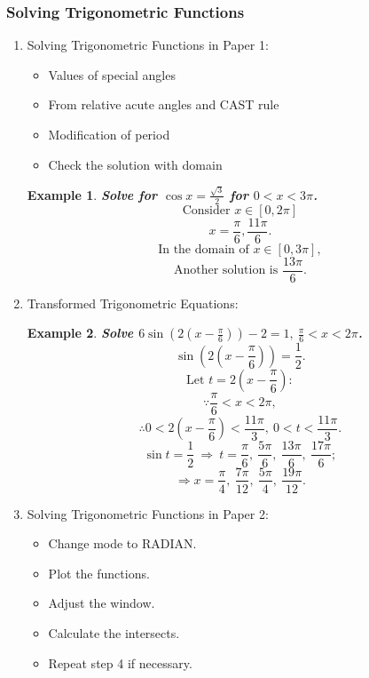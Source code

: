 \documentclass[12pt, a4paper]{article}
\newtheorem{example}{Example}[subsection]
\begin{document}
\subsubsection{Solving Trigonometric Functions}
\begin{enumerate}
  \item Solving Trigonometric Functions in Paper 1: 
  \begin{itemize}
    \item Values of special angles
    \item From relative acute angles and CAST rule
    \item Modification of period
    \item Check the solution with domain
  \end{itemize}
  \begin{example}
    \textbf{Solve for $\cos{x}=\frac{\sqrt{3}}{2}$ for $0<x<3\pi$.}
    $$\text{Consider }x\in[0,2\pi]$$
    $$x=\frac{\pi}{6}, \frac{11\pi}{6}.$$
    $$\text{In the domain of }x\in[0,3\pi],$$
    $$\text{Another solution is }\frac{13\pi}{6}.$$
  \end{example}
  \item Transformed Trigonometric Equations: 
  \begin{example}
    \textbf{Solve $6\sin\left(2\left(x-\frac{\pi}{6}\right)\right)-2=1,\ \frac{\pi}{6}<x<2\pi$.}
    $$\sin\left(2\left(x-\frac{\pi}{6}\right)\right)=\frac{1}{2}.$$
    $$\text{Let }t=2\left(x-\frac{\pi}{6}\right):$$
    $$\because \frac{\pi}{6}<x<2\pi, $$
    $$\therefore 0<2\left(x-\frac{\pi}{6}\right)<\frac{11\pi}{3},\ 0<t<\frac{11\pi}{3}.$$
    $$\sin t=\frac{1}{2}\ \Rightarrow\ t=\frac{\pi}{6},\ \frac{5\pi}{6},\ \frac{13\pi}{6},\ \frac{17\pi}{6};$$
    $$\Rightarrow x=\frac{\pi}{4},\ \frac{7\pi}{12},\ \frac{5\pi}{4},\ \frac{19\pi}{12}.$$
  \end{example}
  \item Solving Trigonometric Functions in Paper 2: 
  \begin{itemize}
    \item Change mode to RADIAN.
    \item Plot the functions. 
    \item Adjust the window. 
    \item Calculate the intersects.
    \item Repeat step 4 if necessary. 
  \end{itemize}
\end{enumerate}
\end{document}
